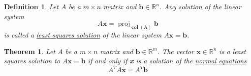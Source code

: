 \documentclass{article}
\theoremstyle{definitionstyle}
\newtheorem{definition}{Definition}[section]
\newtheorem{theorem}{Theorem}[section]
\DeclareMathOperator{\proj}{proj}
\newcommand{\vct}{\mathbf}
\newcommand{\vctproj}[2][]{\proj_{\vct{#1}}\vct{#2}}
\begin{document}
\begin{definition}
    Let $A$ be a $m \times n$ matrix and $\vct b \in \mathbb{R}^n$. Any solution of the linear system 
    \begin{equation*}
        A\vct x = \vctproj[\operatorname*{col}(\mathrm{A})]{b}
    \end{equation*}
    is called a \underline{least squares solution} of the linear system $A \vct x = \vct b$.
\end{definition}

\begin{theorem}
    Let $A$ be a $m \times n$ matrix and $\vct b \in \mathbb{R}^m$. The vector $\vct x \in \mathbb{R}^n$ is a least
    squares solution to $A \vct x = \vct b$ if and only if \textbf{x} is a solution of the \underline{normal equations}
    \begin{equation*}
        A^T A \vct x = A^T \vct b
    \end{equation*}
\end{theorem}
\end{document}
